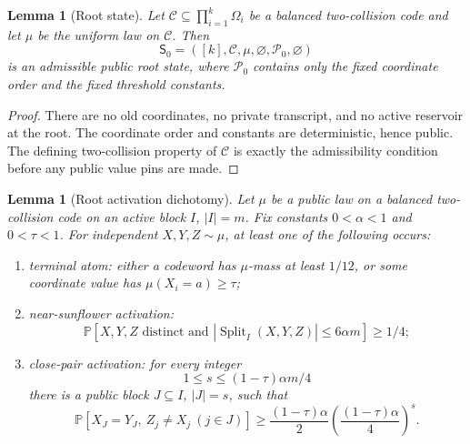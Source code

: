 \documentclass[11pt]{article}
\newtheorem{lemma}[theorem]{Lemma}
\newcommand{\C}{\mathcal C}
\newcommand{\Prb}{\mathbb P}
\newcommand{\Split}{\operatorname{Split}}
\begin{document}
\begin{lemma}[Root state]
\label{lem:root-state}
Let $\C\subseteq\prod_{i=1}^k\Omega_i$ be a balanced two-collision code and
let $\mu$ be the uniform law on $\C$.  Then
\[
  \mathsf S_0=([k],\C,\mu,\varnothing,\mathcal P_0,\varnothing)
\]
is an admissible public root state, where $\mathcal P_0$ contains only the
fixed coordinate order and the fixed threshold constants.
\end{lemma}

\begin{proof}
There are no old coordinates, no private transcript, and no active reservoir
at the root.  The coordinate order and constants are deterministic, hence
public.  The defining two-collision property of $\C$ is exactly the
admissibility condition before any public value pins are made.
\end{proof}

\begin{lemma}[Root activation dichotomy]
\label{lem:root-activation}
Let $\mu$ be a public law on a balanced two-collision code on an active block
$I$, $|I|=m$.  Fix constants $0<\alpha<1$ and $0<\tau<1$.  For independent
$X,Y,Z\sim\mu$, at least one of the following occurs:
\begin{enumerate}[label=\textup{(\roman*)}]
\item terminal atom: either a codeword has $\mu$-mass at least $1/12$, or
some coordinate value has $\mu(X_i=a)\ge\tau$;
\item near-sunflower activation:
  \[
    \Prb\!\left[X,Y,Z\text{ distinct and }
      |\Split_I(X,Y,Z)|\le 6\alpha m\right]\ge 1/4;
  \]
\item close-pair activation: for every integer
  \[
    1\le s\le (1-\tau)\alpha m/4
  \]
  there is a public block $J\subseteq I$, $|J|=s$, such that
  \[
    \Prb[X_J=Y_J,\ Z_j\ne X_j\ (j\in J)]
    \ge
    \frac{(1-\tau)\alpha}{2}
    \left(\frac{(1-\tau)\alpha}{4}\right)^s .
  \]
\end{enumerate}
\end{lemma}
\end{document}
